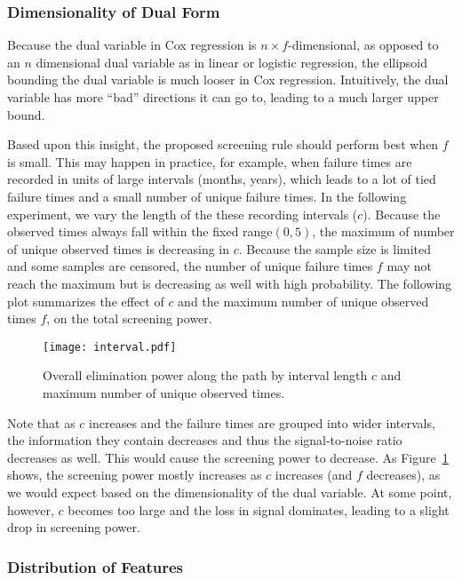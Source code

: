 \subsubsection{Dimensionality of Dual Form}

Because the dual variable in Cox regression is $n\times f$-dimensional, as opposed to an $n$ dimensional dual variable as in linear or logistic regression, the ellipsoid bounding the dual variable is much looser in Cox regression. Intuitively, the dual variable has more ``bad'' directions it can go to, leading to a much larger upper bound.

Based upon this insight, the proposed screening rule should perform best when $f$ is small. This may happen in practice, for example, when failure times are recorded in units of large intervals (months, years), which leads to a lot of tied failure times and a small number of unique failure times. In the following experiment, we vary the length of the these recording intervals ($c$). Because the observed times always fall within the fixed range$(0,5)$, the maximum of number of unique observed times is decreasing in $c$. Because the sample size is limited and some samples are censored, the number of unique failure times $f$ may not reach the maximum but is decreasing as well with high probability. The following plot summarizes the effect of $c$ and the maximum number of unique observed times $f$, on the total screening power.

\begin{figure}[ht]
    \centering
    \texttt{[image: interval.pdf]}
    \caption[Overall power by interval length $c$ and maximum number of unique observed times
    ]{Overall elimination power along the path by interval length $c$ and maximum number of unique observed times.\label{Fig:interval}}
\end{figure}

Note that as $c$ increases and the failure times are grouped into wider intervals, the information they contain decreases and thus the signal-to-noise ratio decreases as well. This would cause the screening power to decrease. As Figure~\ref{Fig:interval} shows, the screening power mostly increases as $c$ increases (and $f$ decreases), as we would expect based on the dimensionality of the dual variable. At some point, however, $c$ becomes too large and the loss in signal dominates, leading to a slight drop in screening power.

\subsubsection{Distribution of Features}


